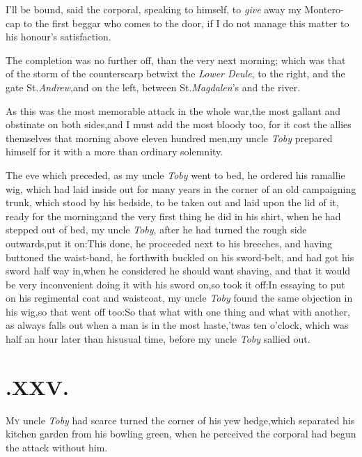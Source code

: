 \documentclass{article}
\begin{document}
I’ll be bound, said the corporal, speaking to himself, to
\textit{give} away my Montero-cap to the first beggar who comes to the door,
if I do not manage this matter to\break
his honour’s satisfaction.

\newpage
The completion was no further off, than the very next morning; which was that of the
storm of the counterscarp betwixt the \textit{Lower Deule}, to the right, and the
gate St.\@ \textit{Andrew},\tsk and on the left, between St.\@ \textit{Magdalen}’s
and the river.

As this was the most memorable attack in the whole
war,\tsk the most gallant and obstinate on both sides,\tsk and
I must add the most bloody too, for it cost the allies themselves
that morning above eleven hundred men,\tsk my uncle \textit{Toby}
prepared himself for it with a more than ordinary solemnity.

The eve which preceded, as my uncle \textit{Toby} went to bed, he
ordered his ramallie wig, which had laid inside out for many years
in the corner of an old campaigning trunk, which stood by his\pb
\setlength{\baselineskip}{13.3636pt}%
bedside, to be taken out and laid upon the lid of it, ready for the morning;\tsk and the
very first thing he did in his shirt, when he had stepped out of
bed, my uncle \textit{Toby}, after he had turned the rough side
outwards,\tsk put it on:\tsh\break This done, he proceeded
next to his breeches, and having buttoned the waist-band, he
forthwith buckled on his sword-belt, and had got his sword half way
in,\break\tsk when he considered he should want shaving, and that it
would be very inconvenient doing it with his sword on,\tsk so
took it off:\tsh In essaying to put on his regimental coat
and waistcoat, my uncle \textit{Toby} found the same objection in his
wig,\tsk so that went off too:\tsk So that what with one thing
and what with another, as always falls out when a man is in the
most haste,\tsk ’twas ten o’clock, which was half an
hour later than his\pb usual time, before my uncle \textit{Toby} sallied
out.

\enlargethispage\baselineskip
\section{.\enspace XXV.}

\lettrine{M}{y} uncle \textit{Toby} had scarce
turned the corner of his yew hedge,\break which separated his
kitchen garden from his bowling green, when he perceived the
corporal had begun the attack without him.\tsh
\end{document}
